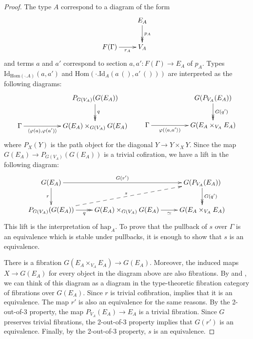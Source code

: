 \documentclass[reqno]{amsart}
\theoremstyle{definition}
\theoremstyle{remark}
\newcommand{\fs}[1]{\mathrm{#1}}
\newcommand{\Hom}{\fs{Hom}}
\newcommand{\Id}{\fs{Id}}
\numberwithin{figure}{section}
\begin{document}
\begin{proof}
The type $A$ correspond to a diagram of the form
\[ \xymatrix{                           & E_A \ar@{->>}[d]^{p_A} \\
              F(\Gamma) \ar[r]_-{r_A}   & V_A
            } \]
and terms $a$ and $a'$ correspond to section $a,a' : F(\Gamma) \to E_A$ of $p_A$.
Types $\Id_{\Hom(\cdot . A)}(a,a')$ and $\Hom(\cdot . \Id_A(a\,(),a'\,()))$ are interpreted as the following diagrams:
\[ \xymatrix{                                                           & & P_{G(V_A)}(G(E_A)) \ar@{->>}[d]^q \\
              \Gamma \ar[rr]_-{\langle \varphi(a), \varphi(a') \rangle} & & G(E_A) \times_{G(V_A)} G(E_A)
            } \qquad
   \xymatrix{                                                   & & G(P_{V_A}(E_A)) \ar@{->>}[d]^{G(q')} \\
              \Gamma \ar[rr]_-{\varphi(\langle a, a' \rangle)}  & & G(E_A \times_{V_A} E_A)
            } \]
where $P_{X}(Y)$ is the path object for the diagonal $Y \to Y \times_{X} Y$.
Since the map $G(E_A) \to P_{G(V_A)}(G(E_A))$ is a trivial cofiration, we have a lift in the following diagram:
\[ \xymatrix{ G(E_A) \ar[d]_r \ar[rr]^-{G(r')}                      &                                               & G(P_{V_A}(E_A)) \ar@{->>}[d]^{G(q')} \\
              P_{G(V_A)}(G(E_A)) \ar@{->>}[r]_-q \ar@{-->}[urr]^s   & G(E_A) \times_{G(V_A)} G(E_A) \ar[r]_-\simeq  & G(E_A \times_{V_A} E_A)
            } \]
This lift is the interpretation of $\fs{hap}_A$.
To prove that the pullback of $s$ over $\Gamma$ is an equivalence which is stable under pullbacks, it is enough to show that $s$ is an equivalence.

There is a fibration $G(E_A \times_{V_A} E_A) \to G(E_A)$.
Moreover, the induced maps $X \to G(E_A)$ for every object in the diagram above are also fibrations.
By  and , we can think of this diagram as a diagram in the type-theoretic fibration category of fibrations over $G(E_A)$.
Since $r$ is trivial cofibration, \cite[Lemma~3.6]{shul-inv} implies that it is an equivalence.
The map $r'$ is also an equivalence for the same reasons.
By the 2-out-of-3 property, the map $P_{V_A}(E_A) \to E_A$ is a trivial fibration.
Since $G$ preserves trivial fibrations, the 2-out-of-3 property implies that $G(r')$ is an equivalence.
Finally, by the 2-out-of-3 property, $s$ is an equivalence.
\end{proof}

\end{document}
